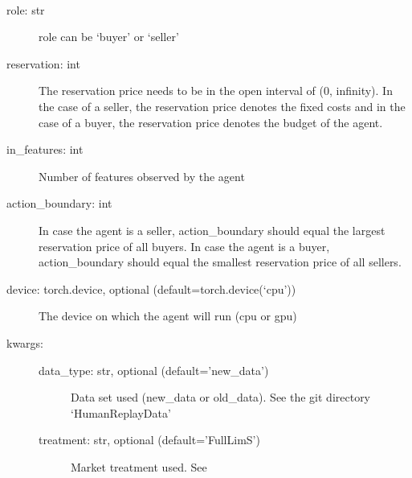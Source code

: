 \documentclass[letterpaper,10pt,english]{sphinxmanual}
\begin{document}
\begin{fulllineitems}

\begin{fulllineitems}
\label{\detokenize{MultiAgentMarketRL:agents.HumanReplayAgent.__init__}}~\begin{description}
\item[{role: str}] \leavevmode
\sphinxAtStartPar
role can be ‘buyer’ or ‘seller’

\item[{reservation: int}] \leavevmode
\sphinxAtStartPar
The reservation price needs to be in the open interval of (0, infinity). In the case of a seller, the
reservation price denotes the fixed costs and in the case of a buyer, the reservation price denotes the
budget of the agent.

\item[{in\_features: int}] \leavevmode
\sphinxAtStartPar
Number of features observed by the agent

\item[{action\_boundary: int}] \leavevmode
\sphinxAtStartPar
In case the agent is a seller, action\_boundary should equal the largest reservation price of all buyers.
In case the agent is a buyer, action\_boundary should equal the smallest reservation price of all sellers.

\item[{device: torch.device, optional (default=torch.device(‘cpu’))}] \leavevmode
\sphinxAtStartPar
The device on which the agent will run (cpu or gpu)

\item[{kwargs:}] \leavevmode\begin{description}
\item[{data\_type: str, optional (default=’new\_data’)}] \leavevmode
\sphinxAtStartPar
Data set used (new\_data or old\_data). See the git directory ‘HumanReplayData’

\item[{treatment: str, optional (default=’FullLimS’)}] \leavevmode
\sphinxAtStartPar
Market treatment used. See 


\end{description}
\end{description}
\end{fulllineitems}
\end{fulllineitems}
\end{document}
